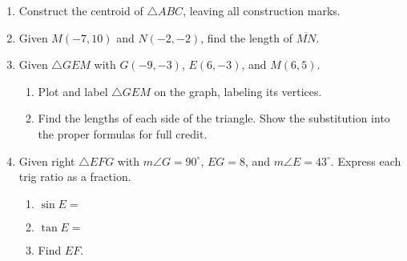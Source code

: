 \documentclass[12pt, oneside]{article}
\begin{document}
\begin{enumerate}
\newpage

\item Construct the centroid of $\triangle ABC$, leaving all construction marks.
  \vspace{5cm}
  \begin{center}
\end{center} \vspace{1.5cm}

\newpage

  \item Given $M(-7,10)$ and $N(-2,-2)$, find the length of $\overline{MN}$.
      \vspace{5cm}

  \item Given $\triangle GEM$ with $G(-9, -3)$, $E(6, -3)$, and $M(6, 5)$.
    \begin{enumerate}
      \item Plot and label $\triangle GEM$ on the graph, labeling its vertices.
      \item Find the lengths of each side of the triangle. Show the substitution into the proper formulas for full credit.
    \end{enumerate}
    \vspace{3cm}


\newpage
\item Given right $\triangle EFG$ with $m\angle G=90^\circ$, $EG=8$, and $m\angle E=43^\circ$. Express each trig ratio as a fraction.  \vspace{0.5cm}
\begin{multicols}{2}
  \begin{enumerate}
    \item $\sin E=$ \vspace{0.8cm}
    \item $\tan E=$ \vspace{0.8cm}
    \item Find $EF$.
  \end{enumerate}
  \begin{center}
      \vspace{2cm}
  \end{center}
\end{multicols}
\vspace{3cm}


\end{enumerate}
\end{document}
